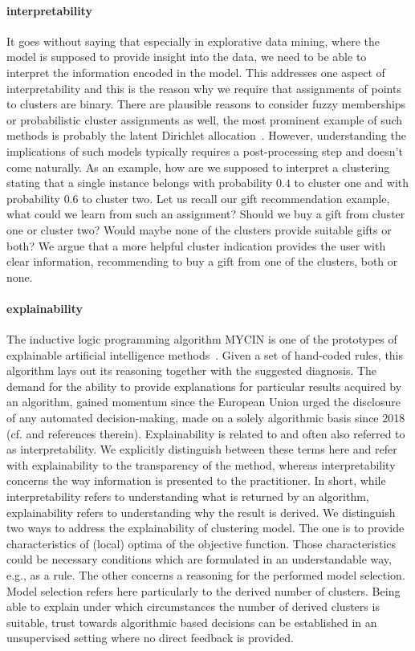 \paragraph{interpretability} 
It goes without saying that especially in explorative data mining, where the model is supposed to provide insight into the data, we need to be able to interpret the information encoded in the model. This addresses one aspect of interpretability and this is the reason why we require that assignments of points to clusters are binary. There are plausible reasons to consider fuzzy memberships or probabilistic cluster assignments as well, the most prominent example of such methods is probably the latent Dirichlet allocation~\citep{blei2003latent}. However, understanding the implications of such models typically requires a post-processing step and doesn't come naturally. As an example, how are we supposed to interpret a clustering stating that a single instance belongs with probability $0.4$ to cluster one and with probability $0.6$ to cluster two. Let us recall our gift recommendation example, what could we learn from such an assignment? Should we buy a gift from cluster one or cluster two? Would maybe none of the clusters provide suitable gifts or both? We argue that a more helpful cluster indication provides the user with clear information, recommending to buy a gift from one of the clusters, both or none.  
\paragraph{explainability} 
The inductive logic programming algorithm MYCIN is one of the prototypes of explainable artificial intelligence methods~\citep{fagan1980computer}. Given a set of hand-coded rules, this algorithm lays out its reasoning together with the suggested diagnosis. 
The demand for the ability to provide explanations for particular results acquired by an algorithm, gained momentum since the European Union urged the disclosure of any automated decision-making, made on a solely algorithmic basis since 2018 (cf.\@ \cite{doshi2017towards} and references therein). Explainability is related to and often also referred to as interpretability. We explicitly distinguish between these terms here and refer with explainability to the transparency of the method, whereas interpretability concerns the way information is presented to the practitioner. In short, while interpretability refers to understanding what is returned by an algorithm, explainability refers to understanding why the result is derived. We distinguish two ways to address the explainability of clustering model. The one is to provide characteristics of (local) optima of the objective function. Those characteristics could be necessary conditions which are formulated in an understandable way, e.g., as a rule. The other concerns a reasoning for the performed model selection. Model selection refers here particularly to the derived number of clusters. Being able to explain under which circumstances the number of derived clusters is suitable, trust towards algorithmic based decisions can be established in an unsupervised setting where no direct feedback is provided.
